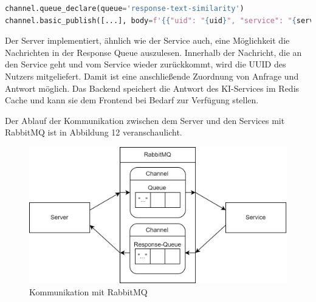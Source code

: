 \begin{lstlisting}[language=Python, caption={Senden eines KI-Ergebnisses an das Backend }]
channel.queue_declare(queue='response-text-similarity')
channel.basic_publish([...], body=f'{{"uid": "{uid}", "service": "{service}", "message": {json.dumps(message)}}}'.encode('utf-8'))
\end{lstlisting}

Der Server implementiert, ähnlich wie der Service auch, eine Möglichkeit die Nachrichten in der Response Queue auszulesen. Innerhalb der Nachricht, die an den Service geht und vom Service wieder zurückkommt, wird die UUID des Nutzers mitgeliefert. Damit ist eine anschließende Zuordnung von Anfrage und Antwort möglich. Das Backend speichert die Antwort des KI-Services im Redis Cache und kann sie dem Frontend bei Bedarf zur Verfügung stellen.

Der Ablauf der Kommunikation zwischen dem Server und den Services mit RabbitMQ ist in Abbildung 12 veranschaulicht. 
\begin{figure}[H]
  \centering
    \includegraphics[width = 15cm]{bilder/Rabbit3}
    \caption{Kommunikation mit RabbitMQ}
\end{figure}

